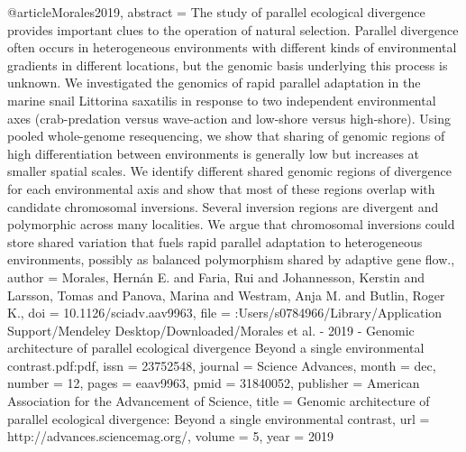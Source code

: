 @article{Morales2019,
abstract = {The study of parallel ecological divergence provides important clues to the operation of natural selection. Parallel divergence often occurs in heterogeneous environments with different kinds of environmental gradients in different locations, but the genomic basis underlying this process is unknown. We investigated the genomics of rapid parallel adaptation in the marine snail Littorina saxatilis in response to two independent environmental axes (crab-predation versus wave-action and low-shore versus high-shore). Using pooled whole-genome resequencing, we show that sharing of genomic regions of high differentiation between environments is generally low but increases at smaller spatial scales. We identify different shared genomic regions of divergence for each environmental axis and show that most of these regions overlap with candidate chromosomal inversions. Several inversion regions are divergent and polymorphic across many localities. We argue that chromosomal inversions could store shared variation that fuels rapid parallel adaptation to heterogeneous environments, possibly as balanced polymorphism shared by adaptive gene flow.},
author = {Morales, Hern{\'{a}}n E. and Faria, Rui and Johannesson, Kerstin and Larsson, Tomas and Panova, Marina and Westram, Anja M. and Butlin, Roger K.},
doi = {10.1126/sciadv.aav9963},
file = {:Users/s0784966/Library/Application Support/Mendeley Desktop/Downloaded/Morales et al. - 2019 - Genomic architecture of parallel ecological divergence Beyond a single environmental contrast.pdf:pdf},
issn = {23752548},
journal = {Science Advances},
month = {dec},
number = {12},
pages = {eaav9963},
pmid = {31840052},
publisher = {American Association for the Advancement of Science},
title = {{Genomic architecture of parallel ecological divergence: Beyond a single environmental contrast}},
url = {http://advances.sciencemag.org/},
volume = {5},
year = {2019}
}
